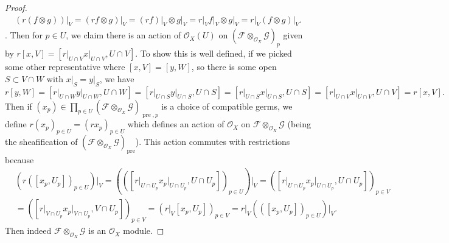 \documentclass{article}
\newcommand{\fF}{\mathscr{F}}
\newcommand{\fG}{\mathscr{G}}
\newcommand{\fO}{\mathscr{O}}
\DeclareMathOperator{\pre}{\mathrm{pre}}
\begin{document}
\begin{proof}
    \begin{align*}
        \left( r(f\otimes g) \right) \vert_V = (rf\otimes g)\vert_V = (rf)\vert_V \otimes g \vert_V = r\vert_V f\vert_V \otimes g \vert_V = r\vert_V (f \otimes g)\vert_V.
    \end{align*}
    \fi. Then for $p\in U$, we claim there is an action of $\fO_X(U)$ on $(\fF\otimes_{\fO_X} \fG)_p$ given by \newline $r[x,V] = [r\vert_{U\cap V} x\vert_{U\cap V},U\cap V]$. To show this is well defined, if we picked some other representative where $[x,V]=[y,W]$, so there is some open $S\subset V\cap W$ with $x\vert_S = y\vert_S$, we have
    \[
    r[y,W] = [r\vert_{U\cap W} y\vert_{U\cap W}, U\cap W]=[r\vert_{U\cap S} y\vert_{U\cap S}, U\cap S]=[r\vert_{U\cap S} x\vert_{U\cap S}, U\cap S]=[r\vert_{U\cap V} x\vert_{U\cap V},U\cap V] = r[x,V].
    \]
    Then if $(x_p)\in \prod_{p\in U} (\fF\otimes_{\fO_X} \fG)_{\pre,p}$ is a choice of compatible germs, we define $r(x_p)_{p\in U} = (rx_p)_{p\in U}$ which defines an action of $\fO_X$ on $\fF\otimes_{\fO_X} \fG$ (being the sheafification of $(\fF\otimes_{\fO_X} \fG)_{\pre}$). This action commutes with restrictions because
\begin{align*}
    &\left( r([x_p, U_p])_{p\in U}\right) \vert_{V} = \left( ([r\vert_{U\cap U_p} x_p \vert_{U\cap U_p}, U\cap U_p])_{p\in U} \right) \vert_V=([r\vert_{U\cap U_p} x_p \vert_{U\cap U_p}, U\cap U_p])_{p\in V}\\
    &=([r\vert_{V\cap U_p} x_p \vert_{V\cap U_p}, V\cap U_p])_{p\in V}=  (r\vert_V[x_p ,U_p])_{p\in V} = r\vert_V \left( ([x_p,U_p])_{p\in U}\right)\vert_{V}.
\end{align*}
    Then indeed $\fF \otimes_{\fO_X} \fG$ is an $\fO_X$ module.
    

\end{proof}
\end{document}
